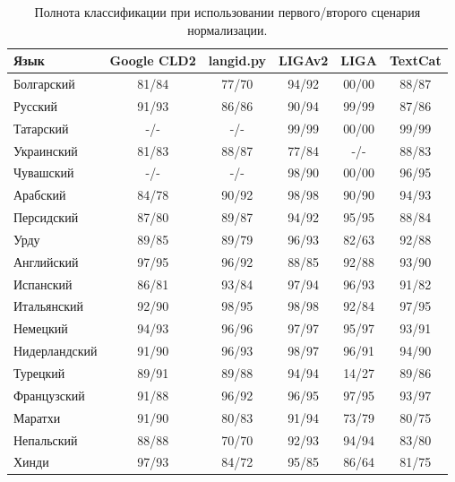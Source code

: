 \documentclass[a4paper, 14pt]{article}
\begin{document}
\begin{center}
\begin{table}
\begin{tabular*}{0.933\textwidth}{| l| *{5}{c} |}
\hline 
Язык & Google CLD2 & langid.py & LIGAv2 & LIGA & TextCat \\
\hline
\hline
Болгарский & 81/84 & 77/70 & 94/92 & 00/00 & 88/87 \\
Русский & 91/93 & 86/86 & 90/94 & 99/99 & 87/86 \\
Татарский & -/- & -/- & 99/99 & 00/00 & 99/99 \\
Украинский & 81/83 & 88/87 & 77/84 & -/- & 88/83 \\
Чувашский & -/- & -/- & 98/90 & 00/00 & 96/95 \\

\hline
\hline
Арабский & 84/78 & 90/92 & 98/98 & 90/90 & 94/93 \\
Персидский & 87/80 & 89/87 & 94/92 & 95/95 & 88/84 \\
Урду & 89/85 & 89/79 & 96/93 & 82/63 & 92/88 \\

\hline
\hline
Английский & 97/95 & 96/92 & 88/85 & 92/88 & 93/90 \\
Испанский & 86/81 & 93/84 & 97/94 & 96/93 & 91/82 \\
Итальянский & 92/90 & 98/95 & 98/98 & 92/84 & 97/95 \\
Немецкий & 94/93 & 96/96 & 97/97 & 95/97 & 93/91 \\
Нидерландский & 91/90 & 96/93 & 98/97 & 96/91 & 94/90 \\
Турецкий & 89/91 & 89/88 & 94/94 & 14/27 & 89/86 \\
Французский & 91/88 & 96/92 & 96/95 & 97/95 & 93/97 \\
\hline
\hline
Маратхи & 91/90 & 80/83 & 91/94 & 73/79 & 80/75 \\
Непальский & 88/88 & 70/70 & 92/93 & 94/94 & 83/80 \\
Хинди & 97/93 & 84/72 & 95/85 & 86/64 & 81/75 \\

\hline
\end{tabular*}
\caption{Полнота классификации при использовании первого/второго сценария нормализации.}
\end{table}
\end{center}


	\begin{center}
	\end{center}		
	
\end{document}

